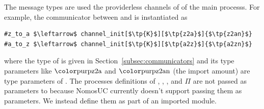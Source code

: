 The message types are used the providerless channels of of the main processs. For example, the communicator between \Z and \A is instantiated as
\begin{lstlisting}[basicstyle=\footnotesize\BeraMonottFamily, mathescape]
#z_to_a $\leftarrow$ channel_init[$\tp{K}$][$\tp{z2a}$]{$\tp{z2an}$}
#a_to_z $\leftarrow$ channel_init[$\tp{K}$][$\tp{a2z}$]{$\tp{a2zn}$}
\end{lstlisting}
where the type of  is given in Section~\ref{subsec:communicators} and its type parameters like $\tp{z2a}$ and $\tp{z2an}$ (the import amount) are type parameters of .
The processes definitions of \Z, \A, \F, and $\Pi$ are not passed as parameters to  because NomosUC currently doesn't support passing them as parameters. We instead define them as part of an imported module. 


